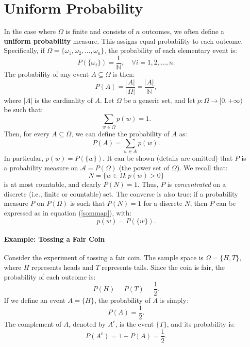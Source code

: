     \section{Uniform Probability}
    In the case where $\Omega$ is finite and consists of $n$ outcomes, we often define a \textbf{uniform probability} measure. This assigns equal probability to each outcome. Specifically, if $\Omega = \{\omega_1, \omega_2, \dots, \omega_n\}$, the probability of each elementary event is:
    \[
    P(\{\omega_i\}) = \frac{1}{\mathbb{N}}, \quad \forall i = 1, 2, \dots, n.
    \]
    The probability of any event $A \subseteq \Omega$ is then:
    \[
    P(A) = \frac{|A|}{|\Omega|} = \frac{|A|} {\mathbb{N}},
    \]
    where $|A|$ is the cardinality of $A$.\newline
    Let \( \Omega \) be a generic set, and let \( p : \Omega \to [0, +\infty) \) be such that:
    \[
    \sum_{w \in \Omega} p(w) = 1.
    \]
    Then, for every \( A \subseteq \Omega \), we can define the probability of \( A \) as:
    \begin{equation}
        P(A) = \sum_{w \in A} p(w). \label{sommap}
    \end{equation}
    In particular, \( p(w) = P(\{w\}) \). It can be shown (details are omitted) that \( P \) is a probability measure on \( \mathcal{A}=P(\Omega) \) (the power set of \( \Omega \)). We recall that:
    \[
    N = \{ w \in \Omega : p(w) > 0 \}
    \]
    is at most countable, and clearly \( P(N) = 1 \). Thus, \( P \) is \textit{concentrated} on a discrete (i.e., finite or countable) set. \newline
    The converse is also true: if a probability measure \( P \) on \( P(\Omega) \) is such that \( P(N) = 1 \) for a discrete \( N \), then \( P \) can be expressed as in equation (\ref{sommap}), with:
    \[
    p(w) = P(\{w\}).
    \]
    \paragraph{Example: Tossing a Fair Coin}
    Consider the experiment of tossing a fair coin. The sample space is $\Omega = \{H, T\}$, where $H$ represents heads and $T$ represents tails. Since the coin is fair, the probability of each outcome is:
    \[
    P(H) = P(T) = \frac{1}{2}.
    \]
    If we define an event $A = \{H\}$, the probability of $A$ is simply:
    \[
    P(A) = \frac{1}{2}.
    \]
    The complement of $A$, denoted by $A^c$, is the event $\{T\}$, and its probability is:
    \[
    P(A^c) = 1 - P(A) = \frac{1}{2}.
    \]

